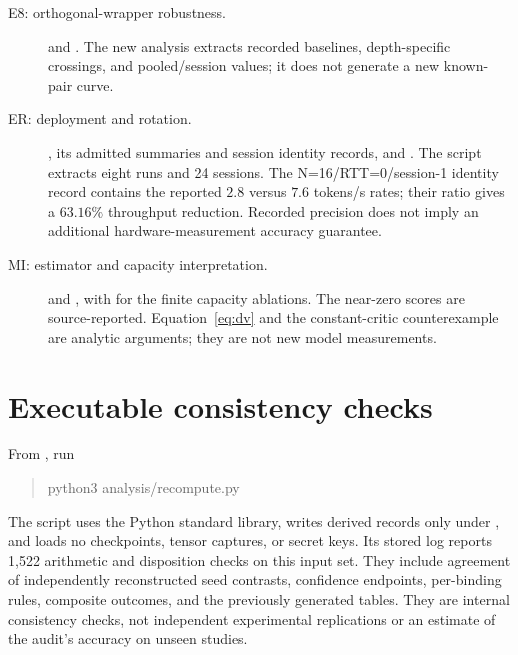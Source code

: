 \begin{description}
\item[\hypertarget{artifact-E8}{E8: orthogonal-wrapper robustness.}]
and .
The new analysis extracts recorded baselines, depth-specific crossings,
and pooled/session values; it does not generate a new known-pair curve.

\item[\hypertarget{artifact-ER}{ER: deployment and rotation.}]
,
its admitted summaries and session identity records, and
.
The script extracts eight runs and 24 sessions. The N=16/RTT=0/session-1
identity record contains the reported $2.8$ versus $7.6$ tokens/s rates;
their ratio gives a $63.16\%$ throughput reduction. Recorded precision
does not imply an additional hardware-measurement accuracy guarantee.

\item[\hypertarget{artifact-MI}{MI: estimator and capacity interpretation.}]
 and
, with
 for the
finite capacity ablations. The near-zero scores are source-reported.
Equation~\eqref{eq:dv} and the constant-critic counterexample are analytic
arguments; they are not new model measurements.
\end{description}

\section{Executable consistency checks}
\label{app:checks}

From , run
\begin{quote}\small\ttfamily
python3 analysis/recompute.py
\end{quote}
The script uses the Python standard library, writes derived records only
under , and loads no checkpoints, tensor captures,
or secret keys. Its stored log reports 1,522 arithmetic and disposition
checks on this input set. They include agreement of independently
reconstructed seed contrasts, confidence endpoints, per-binding rules,
composite outcomes, and the previously generated tables. They are internal
consistency checks, not independent experimental replications or an
estimate of the audit's accuracy on unseen studies.

